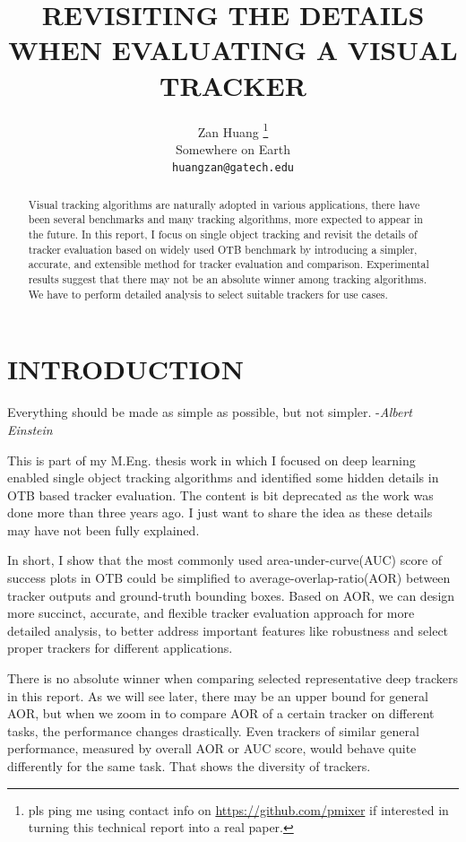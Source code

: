 \documentclass{article}
\title{REVISITING THE DETAILS WHEN EVALUATING A VISUAL TRACKER}
\author{
    Zan Huang \thanks{pls ping me using contact info on \url{https://github.com/pmixer} if interested in turning this technical report into a real paper.}\\
    Somewhere on Earth \\
    \texttt{huangzan@gatech.edu}
}
\begin{document}
\maketitle

\begin{abstract}
Visual tracking algorithms are naturally adopted in various applications, there have been several benchmarks and many tracking algorithms, more expected to appear in the future. In this report, I focus on single object tracking and revisit the details of tracker evaluation based on widely used OTB\cite{otb} benchmark by introducing a simpler, accurate, and extensible method for tracker evaluation and comparison. Experimental results suggest that there may not be an absolute winner among tracking algorithms. We have to perform detailed analysis to select suitable trackers for use cases.
\end{abstract}



\section{INTRODUCTION}
\label{sec:intro}

\begin{displayquote}
Everything should be made as simple as possible, but not simpler. -\emph{Albert Einstein}
\end{displayquote}

This is part of my M.Eng. thesis work in which I focused on deep learning enabled single object tracking algorithms and identified some hidden details in OTB\cite{otb} based tracker evaluation. The content is bit deprecated as the work was done more than three years ago. I just want to share the idea as these details may have not been fully explained.

In short, I show that the most commonly used area-under-curve(AUC) score of success plots in OTB\cite{otb} could be simplified to average-overlap-ratio(AOR) between tracker outputs and ground-truth bounding boxes. Based on AOR, we can design more succinct, accurate, and flexible tracker evaluation approach for more detailed analysis, to better address important features like robustness and select proper trackers for different applications.

There is no absolute winner when comparing selected representative deep trackers in this report. As we will see later, there may be an upper bound for general AOR, but when we zoom in to compare AOR of a certain tracker on different tasks, the performance changes drastically. Even trackers of similar general performance, measured by overall AOR or AUC score, would behave quite differently for the same task. That shows the diversity of trackers.
\end{document}
